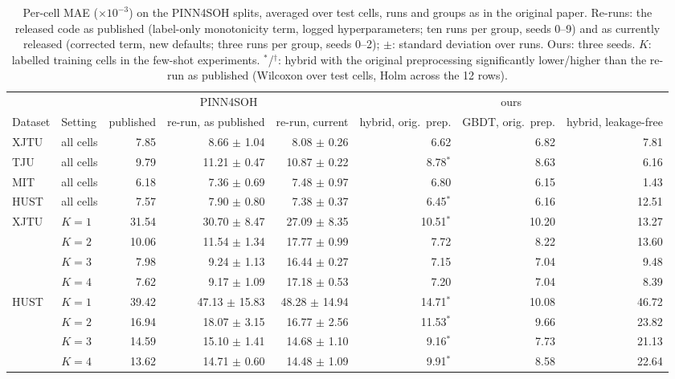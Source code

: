 \begin{table}[t]\centering\small\setlength{\tabcolsep}{4pt}
\caption{Per-cell MAE ($\times10^{-3}$) on the PINN4SOH splits, averaged over test cells, runs and groups as in the original paper. Re-runs: the released code as published (label-only monotonicity term, logged hyperparameters; ten runs per group, seeds 0--9) and as currently released (corrected term, new defaults; three runs per group, seeds 0--2); $\pm$: standard deviation over runs. Ours: three seeds. $K$: labelled training cells in the few-shot experiments. $^{*}$/$^{\dagger}$: hybrid with the original preprocessing significantly lower/higher than the re-run as published (Wilcoxon over test cells, Holm across the 12 rows).}\label{tab:bench}
\begin{adjustbox}{max width=\textwidth}\begin{tabular}{llrrrrrr}\toprule
 & & \multicolumn{3}{c}{PINN4SOH} & \multicolumn{3}{c}{ours} \\\cmidrule(lr){3-5}\cmidrule(lr){6-8}
Dataset & Setting & published & re-run, as published & re-run, current & hybrid, orig.\ prep. & GBDT, orig.\ prep. & hybrid, leakage-free \\\midrule
XJTU & all cells & 7.85 & 8.66 $\pm$ 1.04 & 8.08 $\pm$ 0.26 & 6.62 & 6.82 & 7.81 \\
TJU & all cells & 9.79 & 11.21 $\pm$ 0.47 & 10.87 $\pm$ 0.22 & 8.78$^{*}$ & 8.63 & 6.16 \\
MIT & all cells & 6.18 & 7.36 $\pm$ 0.69 & 7.48 $\pm$ 0.97 & 6.80 & 6.15 & 1.43 \\
HUST & all cells & 7.57 & 7.90 $\pm$ 0.80 & 7.38 $\pm$ 0.37 & 6.45$^{*}$ & 6.16 & 12.51 \\
\addlinespace
XJTU & $K = 1$ & 31.54 & 30.70 $\pm$ 8.47 & 27.09 $\pm$ 8.35 & 10.51$^{*}$ & 10.20 & 13.27 \\
 & $K = 2$ & 10.06 & 11.54 $\pm$ 1.34 & 17.77 $\pm$ 0.99 & 7.72 & 8.22 & 13.60 \\
 & $K = 3$ & 7.98 & 9.24 $\pm$ 1.13 & 16.44 $\pm$ 0.27 & 7.15 & 7.04 & 9.48 \\
 & $K = 4$ & 7.62 & 9.17 $\pm$ 1.09 & 17.18 $\pm$ 0.53 & 7.20 & 7.04 & 8.39 \\
\addlinespace
HUST & $K = 1$ & 39.42 & 47.13 $\pm$ 15.83 & 48.28 $\pm$ 14.94 & 14.71$^{*}$ & 10.08 & 46.72 \\
 & $K = 2$ & 16.94 & 18.07 $\pm$ 3.15 & 16.77 $\pm$ 2.56 & 11.53$^{*}$ & 9.66 & 23.82 \\
 & $K = 3$ & 14.59 & 15.10 $\pm$ 1.41 & 14.68 $\pm$ 1.10 & 9.16$^{*}$ & 7.73 & 21.13 \\
 & $K = 4$ & 13.62 & 14.71 $\pm$ 0.60 & 14.48 $\pm$ 1.09 & 9.91$^{*}$ & 8.58 & 22.64 \\
\bottomrule\end{tabular}\end{adjustbox}\end{table}

